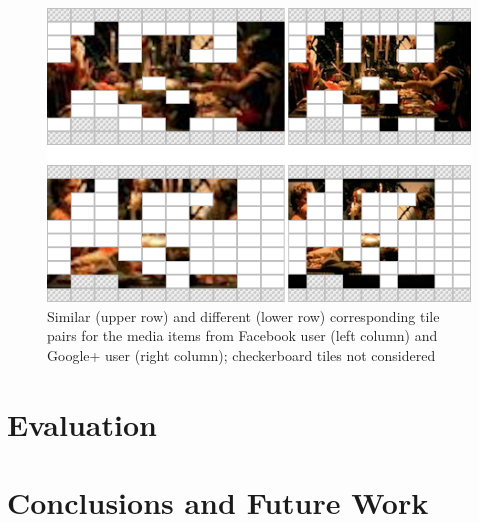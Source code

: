 \documentclass{article}
\begin{document}
\begin{figure}[b!]
  \centering
  \includegraphics[width=0.75\linewidth]{./similar-different.png}
  \caption{Similar (upper row) and different (lower row) corresponding tile pairs for the media items from Facebook user (left column) and Google+ user (right column); checkerboard tiles not considered}
  \label{fig:similar-different}
\end{figure}

\section{Evaluation}
\label{sec:evaluation}

\section{Conclusions and Future Work}
\label{sec:conclusions-and-future-work}



\end{document}
